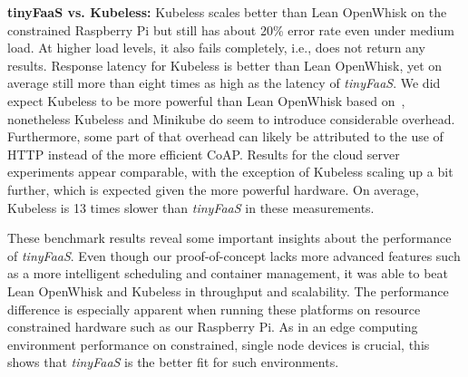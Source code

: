 \textbf{tinyFaaS vs. Kubeless:} Kubeless scales better than Lean OpenWhisk on the constrained Raspberry Pi but still has about 20\% error rate even under medium load.
At higher load levels, it also fails completely, i.e., does not return any results.
Response latency for Kubeless is better than Lean OpenWhisk, yet on average still more than eight times as high as the latency of \textit{tinyFaaS}.
We did expect Kubeless to be more powerful than Lean OpenWhisk based on~\cite{Palade2019-mo}, nonetheless Kubeless and Minikube do seem to introduce considerable overhead.
Furthermore, some part of that overhead can likely be attributed to the use of HTTP instead of the more efficient CoAP.
Results for the cloud server experiments appear comparable, with the exception of Kubeless scaling up a bit further, which is expected given the more powerful hardware.
On average, Kubeless is 13 times slower than \textit{tinyFaaS} in these measurements.

These benchmark results reveal some important insights about the performance of \textit{tinyFaaS}.
Even though our proof-of-concept lacks more advanced features such as a more intelligent scheduling and container management, it was able to beat Lean OpenWhisk and Kubeless in throughput and scalability.
The performance difference is especially apparent when running these platforms on resource constrained hardware such as our Raspberry Pi.
As in an edge computing environment performance on constrained, single node devices is crucial, this shows that \textit{tinyFaaS} is the better fit for such environments.
